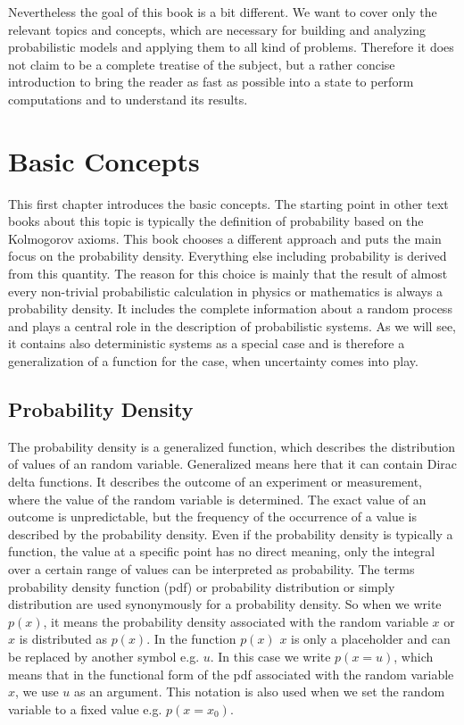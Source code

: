 \documentclass{tstextbook}
\begin{document}
Nevertheless the goal of this book is a bit different. We want to cover only the relevant topics and concepts, which are necessary for building and analyzing probabilistic models and applying them to all kind of problems. Therefore it does not claim to be a complete treatise of the subject, but a rather concise introduction to bring the reader as fast as possible into a state to perform computations and to understand its results.    

\chapter{Basic Concepts}

\begin{summary}
  This first chapter introduces the basic concepts. The starting point in other text books about this topic is typically the definition of probability based on the Kolmogorov axioms. This book chooses a different approach and puts the main focus on the probability density. Everything else including probability is derived from this quantity. The reason for this choice is mainly that the result of almost every non-trivial probabilistic calculation in physics or mathematics is always a probability density. It includes the complete information about a random process and plays a central role in the description of probabilistic systems. As we will see, it contains also deterministic systems as a special case and is therefore a generalization of a function for the case, when uncertainty comes into play.     
\end{summary}

\section{Probability Density}

The probability density is a generalized function, which describes the distribution of values of an random variable. Generalized means here that it can contain Dirac delta functions. It describes the outcome of an experiment or measurement, where the value of the random variable is determined. The exact value of an outcome is unpredictable, but the frequency of the occurrence of a value is described by the probability density. Even if the probability density is typically a function, the value at a specific point has no direct meaning, only the integral over a certain range of values can be interpreted as probability. The terms probability density function (pdf) or probability distribution or simply distribution are used synonymously for a probability density. So when we write $p(x)$, it means the probability density associated with the random variable $x$ or $x$ is distributed as $p(x)$. In the function $p(x)$ $x$ is only a placeholder and can be replaced by another symbol e.g. $u$. In this case we write $p(x=u)$, which means that in the functional form of the pdf associated with the random variable $x$, we use $u$ as an argument. This notation is also used when we set the random variable to a fixed value e.g. $p(x=x_0)$.  
\end{document}
